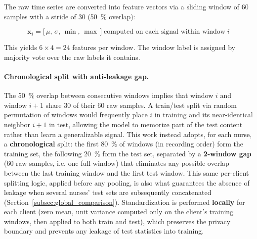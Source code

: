 \documentclass{article}
\begin{document}
The raw time series are converted into feature vectors via a sliding window of 60
samples with a stride of 30 (50~\% overlap):

\begin{equation}
  \mathbf{x}_i = \bigl[\,\mu,\, \sigma,\, \min,\, \max\,\bigr]
  \;\text{computed on each signal within window}\; i
  \label{eq:features}
\end{equation}

This yields $6 \times 4 = 24$ features per window. The window label is assigned by
majority vote over the raw labels it contains.

\paragraph{Chronological split with anti-leakage gap.} The 50~\% overlap between
consecutive windows implies that window $i$ and window $i+1$ share 30 of their 60
raw samples. A train/test split via random permutation of windows would frequently
place $i$ in training and its near-identical neighbor $i+1$ in test, allowing the
model to memorize part of the test content rather than learn a generalizable
signal. This work instead adopts, for each nurse, a \textbf{chronological} split:
the first 80~\% of windows (in recording order) form the training set, the
following 20~\% form the test set, separated by a \textbf{2-window gap} (60 raw
samples, i.e. one full window) that eliminates any possible overlap between the
last training window and the first test window. This same per-client splitting
logic, applied before any pooling, is also what guarantees the absence of leakage
when several nurses' test sets are subsequently concatenated
(Section~\ref{subsec:global_comparison}). Standardization is performed
\textbf{locally} for each client (zero mean, unit variance computed only on the
client's training windows, then applied to both train and test), which preserves
the privacy boundary and prevents any leakage of test statistics into training.
\end{document}
